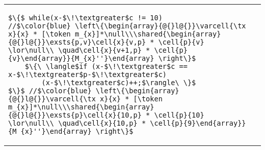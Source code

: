 {\begin{tabular}{@{} l @{\hspace{4ex}} l@{}}
\begin{lstlisting}
$\{$ while(x-$\!\textgreater$c != 10)
//$\color{blue} \left\{\begin{array}{@{}l@{}}\varcell{\tx x}{x} * [\token m_{x}]*\null\\\shared{\begin{array}{@{}l@{}}\exsts{p,v}\cell{x}{v,p} * \cell{p}{v} \lor\null\\ \quad\cell{x}{v+1,p} * \cell{p}{v}\end{array}}{M_{x}''}\end{array} \right\}$
    $\{\ \langle$if (x-$\!\textgreater$c == x-$\!\textgreater$p-$\!\textgreater$c)
        (x-$\!\textgreater$c)++;$\rangle\ \}$
$\}$ //$\color{blue} \left\{\begin{array}{@{}l@{}}\varcell{\tx x}{x} * [\token m_{x}]*\null\\\shared{\begin{array}{@{}l@{}}\exsts{p}\cell{x}{10,p} * \cell{p}{10} \lor\null\\ \quad\cell{x}{10,p} * \cell{p}{9}\end{array}}{M_{x}''}\end{array} \right\}$
\end{lstlisting}
\end{tabular}}


